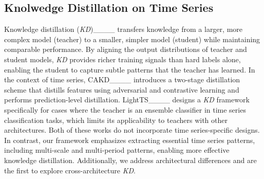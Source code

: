 \subsection{Knolwedge Distillation on Time Series}
Knowledge distillation (\textit{KD})____ transfers knowledge from a larger, more complex model (teacher) to a smaller, simpler model (student) while maintaining comparable performance. By aligning the output distributions of teacher and student models, \textit{KD} provides richer training signals than hard labels alone, enabling the student to capture subtle patterns that the teacher has learned. In the context of time series, CAKD____ introduces a two-stage distillation scheme that distills features using adversarial and contrastive learning and performs prediction-level distillation. LightTS____ designs a \textit{KD} framework specifically for cases where the teacher is an ensemble classifier in time series classification tasks, which limits its applicability to teachers with other architectures. Both of these works do not incorporate time series-specific designs. In contrast, our framework emphasizes extracting essential time series patterns, including multi-scale and multi-period patterns, enabling more effective knowledge distillation. Additionally, we address architectural differences and are the first to explore cross-architecture \textit{KD}.